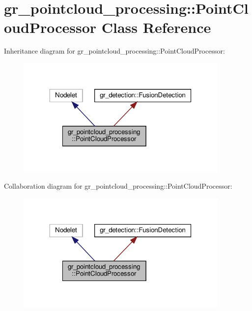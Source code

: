 \hypertarget{classgr__pointcloud__processing_1_1PointCloudProcessor}{}\section{gr\+\_\+pointcloud\+\_\+processing\+:\+:Point\+Cloud\+Processor Class Reference}
\label{classgr__pointcloud__processing_1_1PointCloudProcessor}


Inheritance diagram for gr\+\_\+pointcloud\+\_\+processing\+:\+:Point\+Cloud\+Processor\+:
\nopagebreak
\begin{figure}[H]
\begin{center}
\leavevmode
\includegraphics[width=296pt]{classgr__pointcloud__processing_1_1PointCloudProcessor__inherit__graph}
\end{center}
\end{figure}


Collaboration diagram for gr\+\_\+pointcloud\+\_\+processing\+:\+:Point\+Cloud\+Processor\+:
\nopagebreak
\begin{figure}[H]
\begin{center}
\leavevmode
\includegraphics[width=296pt]{classgr__pointcloud__processing_1_1PointCloudProcessor__coll__graph}
\end{center}
\end{figure}
